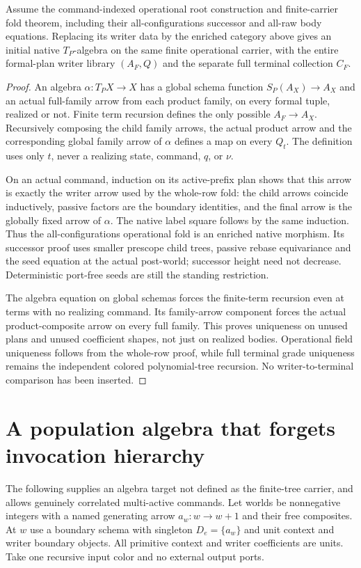 \documentclass[11pt]{article}
\begin{document}
\begin{theorem}
Assume the command-indexed operational root construction and finite-carrier fold theorem, including their all-configurations successor and all-raw body equations. Replacing its writer data by the enriched category above gives an initial native $T_P$-algebra on the same finite operational carrier, with the entire formal-plan writer library $(A_F,Q)$ and the separate full terminal collection $C_F$.
\end{theorem}
\begin{proof}
An algebra $\alpha:T_PX\to X$ has a global schema function $S_P(A_X)\to A_X$ and an actual full-family arrow from each product family, on every formal tuple, realized or not. Finite term recursion defines the only possible $A_F\to A_X$. Recursively composing the child family arrows, the actual product arrow and the corresponding global family arrow of $\alpha$ defines a map on every $Q_t$. The definition uses only $t$, never a realizing state, command, $q$, or $\nu$.

On an actual command, induction on its active-prefix plan shows that this arrow is exactly the writer arrow used by the whole-row fold: the child arrows coincide inductively, passive factors are the boundary identities, and the final arrow is the globally fixed arrow of $\alpha$. The native label square follows by the same induction. Thus the all-configurations operational fold is an enriched native morphism. Its successor proof uses smaller prescope child trees, passive rebase equivariance and the seed equation at the actual post-world; successor height need not decrease. Deterministic port-free seeds are still the standing restriction.

The algebra equation on global schemas forces the finite-term recursion even at terms with no realizing command. Its family-arrow component forces the actual product-composite arrow on every full family. This proves uniqueness on unused plans and unused coefficient shapes, not just on realized bodies. Operational field uniqueness follows from the whole-row proof, while full terminal grade uniqueness remains the independent colored polynomial-tree recursion. No writer-to-terminal comparison has been inserted.
\end{proof}

\section{A population algebra that forgets invocation hierarchy}
The following supplies an algebra target not defined as the finite-tree carrier, and allows genuinely correlated multi-active commands. Let worlds be nonnegative integers with a named generating arrow $a_w:w\to w+1$ and their free composites. At $w$ use a boundary schema with singleton $D_e=\{a_w\}$ and unit context and writer boundary objects. All primitive context and writer coefficients are units. Take one recursive input color and no external output ports.
\end{document}
